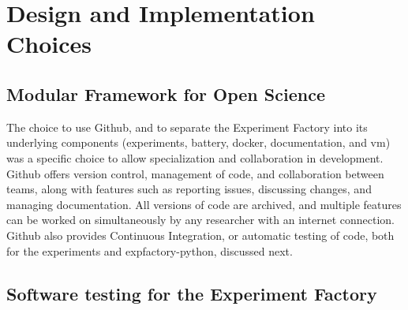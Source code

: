 \documentclass{report}
\begin{document}
\section{Design and Implementation Choices}

\subsection{Modular Framework for Open Science}

The choice to use Github, and to separate the Experiment Factory into
its underlying components (experiments, battery, docker, documentation,
and vm) was a specific choice to allow specialization and collaboration
in development. Github offers version control, management of code, and
collaboration between teams, along with features such as reporting
issues, discussing changes, and managing documentation. All versions of
code are archived, and multiple features can be worked on simultaneously
by any researcher with an internet connection. Github also provides
Continuous Integration, or automatic testing of code, both for the
experiments and expfactory-python, discussed next.

\subsection{Software testing for the Experiment Factory}
\end{document}

